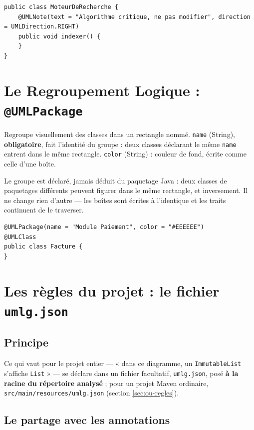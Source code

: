 \documentclass[12pt, a4paper]{article}
\begin{document}
\begin{lstlisting}
public class MoteurDeRecherche {
    @UMLNote(text = "Algorithme critique, ne pas modifier", direction = UMLDirection.RIGHT)
    public void indexer() {
    }
}
\end{lstlisting}

\section{Le Regroupement Logique : \texttt{@UMLPackage}}

Regroupe visuellement des classes dans un rectangle nommé. \texttt{name} (String), \textbf{obligatoire}, fait l'identité du groupe : deux classes déclarant le même \texttt{name} entrent dans le même rectangle. \texttt{color} (String) : couleur de fond, écrite comme celle d'une boîte.

Le groupe est déclaré, jamais déduit du paquetage Java : deux classes de paquetages différents peuvent figurer dans le même rectangle, et inversement. Il ne change rien d'autre --- les boîtes sont écrites à l'identique et les traits continuent de le traverser.

\begin{lstlisting}
@UMLPackage(name = "Module Paiement", color = "#EEEEEE")
@UMLClass
public class Facture {
}
\end{lstlisting}

\section{Les règles du projet : le fichier \texttt{umlg.json}}
\label{sec:regles-projet}

\subsection{Principe}
Ce qui vaut pour le projet entier --- « dans ce diagramme, un \texttt{ImmutableList} s'affiche \texttt{List} » --- se déclare dans un fichier facultatif, \texttt{umlg.json}, posé \textbf{à la racine du répertoire analysé} ; pour un projet Maven ordinaire, \texttt{src/main/resources/umlg.json} (section \ref{sec:ou-regles}).

\subsection{Le partage avec les annotations}
\label{sec:partage}
\end{document}
